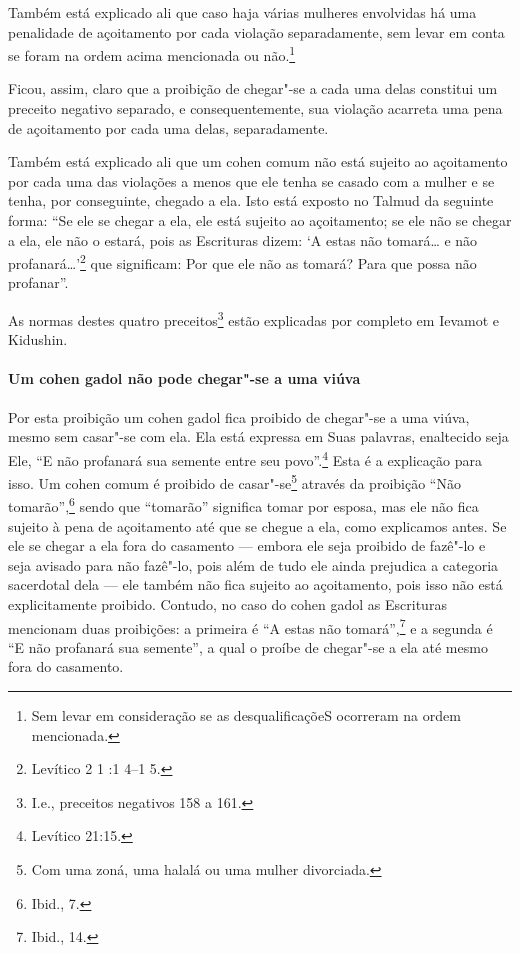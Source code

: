 \begin{multicols}{2}
Também está explicado ali que caso haja várias mulheres envolvidas há
uma penalidade de açoitamento por cada violação separadamente, sem
levar em conta se foram na ordem acima mencionada ou
não.\footnote{Sem levar em consideração se as desqualificaçõeS ocorreram na ordem
mencionada.}

Ficou, assim, claro que a proibição de chegar"-se a cada uma delas
constitui um preceito negativo separado, e consequentemente, sua
violação acarreta uma pena de açoitamento por cada uma delas,
separadamente.

Também está explicado ali que um cohen\starr{} comum não está sujeito ao
açoitamento por cada uma das violações a menos que ele tenha se casado
com a mulher e se tenha, por conseguinte, chegado a ela. Isto está
exposto no Talmud\starr{} da seguinte forma: ``Se ele se chegar a ela, ele está
sujeito ao açoitamento; se ele não se chegar a ela, ele não o estará,
pois as Escrituras dizem: `A estas não tomará\ldots{} e não profanará\ldots{}'\footnote{Levítico 2 1 :1 4--1 5.} que significam: Por que ele não as tomará? Para
que possa não profanar''.

As normas destes quatro preceitos\footnote{I.e., preceitos negativos 158 a 161.} estão explicadas
por completo em Ievamot\starr{} e Kidushin\starr.

\paragraph{Um cohen gadol\starr{} não pode chegar"-se a uma viúva}

Por esta proibição um cohen gadol\starr{} fica proibido de chegar"-se a uma
viúva, mesmo sem casar"-se com ela. Ela está expressa em Suas palavras,
enaltecido seja Ele, ``E não profanará sua semente entre seu povo''.\footnote{Levítico 21:15.} Esta é a explicação para isso. Um cohen\starr{} comum é
proibido de casar"-se\footnote{Com uma zoná\starr, uma halalá\starr{} ou uma mulher divorciada.} através da proibição ``Não
tomarão'',\footnote{Ibid., 7.} sendo que ``tomarão'' significa tomar por esposa,
mas ele não fica sujeito à pena de açoitamento até que se chegue a ela,
como explicamos antes. Se ele se chegar a ela fora do casamento ---
embora ele seja proibido de fazê"-lo e seja avisado para não fazê"-lo,
pois além de tudo ele ainda prejudica a categoria sacerdotal dela ---
ele também não fica sujeito ao açoitamento, pois isso não está
explicitamente proibido. Contudo, no caso do cohen gadol\starr{} as
Escrituras mencionam duas proibições: a primeira é ``A estas não
tomará'',\footnote{Ibid., 14.} e a segunda é ``E não profanará sua semente'', a
qual o proíbe de chegar"-se a ela até mesmo fora do casamento.


\end{multicols}
